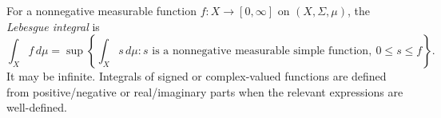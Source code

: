 
For a nonnegative measurable function $f:X\to[0,\infty]$ on $(X,\Sigma,\mu)$, the \emph{Lebesgue integral} is
\[
\int_X f\,d\mu
=\sup\left\{\int_Xs\,d\mu:s\text{ is a nonnegative measurable simple function},\ 0\le s\le f\right\}.
\]
It may be infinite. Integrals of signed or complex-valued functions are defined from positive/negative or real/imaginary parts when the relevant expressions are well-defined.
